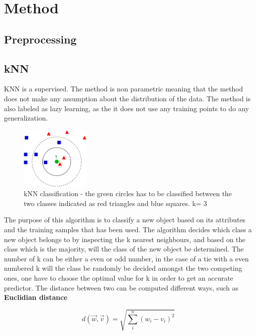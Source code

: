 \section{Method}
\subsection{Preprocessing}
\subsection{kNN}
KNN is a supervised. The method is non parametric meaning that the method does not make any assumption about the distribution of the data. The method is also labeled as lazy learning, as the it does not use any training points to do any generalization.\\

\begin{figure}[H]
\centering
\includegraphics[width = 0.3\textwidth]{img/kNN-classification.png}
\caption{kNN classification  - the green circles has to be classified between the two classes indicated as red triangles and blue squares. k= 3}
\end{figure}

The purpose of this algorithm is to classify a new object based on its attributes and the training samples that has been used. The algorithm decides which class a new object belongs to by inspecting the k nearest neighbours, and based on the class which is the majority, will the class of the new object be determined. The number of k can be either a even or odd number, in the case of a tie with a even numbered k will the class be randomly be decided amongst the two competing ones, one have to choose the optimal value for k  in order to get an accurate predictor. The distance between two can be computed different ways, such as \\

\textbf{Euclidian distance}

\begin{equation}
d(\overrightarrow{w},\overrightarrow{v}) = \sqrt{\sum_{i}^n (w_i - v_i)^2}
\end{equation}

